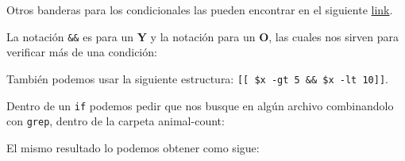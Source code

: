 \documentclass[
]{book}
\newenvironment{Shaded}{\begin{snugshade}}{\end{snugshade}}
\newcommand{\AttributeTok}[1]{\textcolor[rgb]{0.13,0.29,0.53}{#1}}
\newcommand{\BuiltInTok}[1]{#1}
\newcommand{\ControlFlowTok}[1]{\textcolor[rgb]{0.13,0.29,0.53}{\textbf{#1}}}
\newcommand{\ErrorTok}[1]{\textcolor[rgb]{0.64,0.00,0.00}{\textbf{#1}}}
\newcommand{\ExtensionTok}[1]{#1}
\newcommand{\KeywordTok}[1]{\textcolor[rgb]{0.13,0.29,0.53}{\textbf{#1}}}
\newcommand{\NormalTok}[1]{#1}
\newcommand{\OperatorTok}[1]{\textcolor[rgb]{0.81,0.36,0.00}{\textbf{#1}}}
\newcommand{\OtherTok}[1]{\textcolor[rgb]{0.56,0.35,0.01}{#1}}
\newcommand{\StringTok}[1]{\textcolor[rgb]{0.31,0.60,0.02}{#1}}
\newcommand{\VariableTok}[1]{\textcolor[rgb]{0.00,0.00,0.00}{#1}}
\begin{document}
\begin{Shaded}
\end{Shaded}

Otros banderas para los condicionales las pueden encontrar en el siguiente \href{https://www.gnu.org/software/bash/manual/html_node/Bash-Conditional-Expressions.html}{link}.

La notación \texttt{\&\&} es para un \textbf{Y} y la notación \texttt{\textbar{}\textbar{}} para un \textbf{O}, las cuales nos sirven para verificar más de una condición:

\begin{Shaded}
\end{Shaded}

También podemos usar la siguiente estructura: \texttt{{[}{[}\ \$x\ -gt\ 5\ \&\&\ \$x\ -lt\ 10{]}{]}}.

Dentro de un \texttt{if} podemos pedir que nos busque en algún archivo combinandolo con \texttt{grep}, dentro de la carpeta animal-count:

\begin{Shaded}
\end{Shaded}

El mismo resultado lo podemos obtener como sigue:
\end{document}

